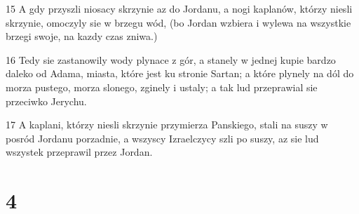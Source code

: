 \par 15 A gdy przyszli niosacy skrzynie az do Jordanu, a nogi kaplanów, którzy niesli skrzynie, omoczyly sie w brzegu wód, (bo Jordan wzbiera i wylewa na wszystkie brzegi swoje, na kazdy czas zniwa.)
\par 16 Tedy sie zastanowily wody plynace z gór, a stanely w jednej kupie bardzo daleko od Adama, miasta, które jest ku stronie Sartan; a które plynely na dól do morza pustego, morza slonego, zginely i ustaly; a tak lud przeprawial sie przeciwko Jerychu.
\par 17 A kaplani, którzy niesli skrzynie przymierza Panskiego, stali na suszy w posród Jordanu porzadnie, a wszyscy Izraelczycy szli po suszy, az sie lud wszystek przeprawil przez Jordan.

\chapter{4}

